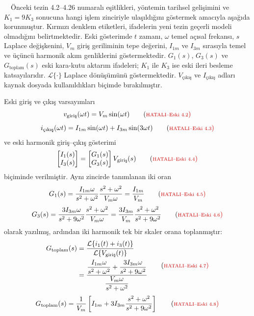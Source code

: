 \eskitezetiketi\ \hatalidenklemetiketi\ Önceki tezin 4.2--4.26 numaralı eşitlikleri, yöntemin tarihsel gelişimini ve $K_1=9K_3$ sonucuna hangi işlem zinciriyle ulaşıldığını göstermek amacıyla aşağıda korunmuştur. Kırmızı denklem etiketleri, ifadelerin yeni tezin geçerli modeli olmadığını belirtmektedir. Eski gösterimde $t$ zamanı, $\omega$ temel açısal frekansı, $s$ Laplace değişkenini, $V_m$ giriş geriliminin tepe değerini, $I_{1m}$ ve $I_{3m}$ sırasıyla temel ve üçüncü harmonik akım genliklerini göstermektedir. $G_1(s)$, $G_3(s)$ ve $G_{\mathrm{toplam}}(s)$ eski kara-kutu aktarım ifadeleri; $K_1$ ile $K_3$ ise eski ileri besleme katsayılarıdır. $\mathcal{L}\{\cdot\}$ Laplace dönüşümünü göstermektedir. $V_{\text{çıkış}}$ ve $I_{\text{çıkış}}$ adları kaynak dosyada kullanıldıkları biçimde bırakılmıştır.

Eski giriş ve çıkış varsayımları
\begin{equation*}
  v_{\text{giriş}}(\omega t)=V_m\sin(\omega t)
  \hatalieskitag{4.2}
\end{equation*}
\begin{equation*}
  i_{\text{çıkış}}(\omega t)
  =I_{1m}\sin(\omega t)+I_{3m}\sin(3\omega t)
  \hatalieskitag{4.3}
\end{equation*}
ve eski harmonik giriş--çıkış gösterimi
\begin{equation*}
  \begin{bmatrix}I_1(s)\\ I_3(s)\end{bmatrix}
  =
  \begin{bmatrix}G_1(s)\\ G_3(s)\end{bmatrix}V_{\text{giriş}}(s)
  \hatalieskitag{4.4}
\end{equation*}
biçiminde verilmiştir. Aynı zincirde tanımlanan iki oran
\begin{equation*}
  G_1(s)
  =\frac{I_{1m}\omega}{s^2+\omega^2}
   \frac{s^2+\omega^2}{V_m\omega}
  =\frac{I_{1m}}{V_m}
  \hatalieskitag{4.5}
\end{equation*}
\begin{equation*}
  G_3(s)
  =\frac{3I_{3m}\omega}{s^2+9\omega^2}
   \frac{s^2+\omega^2}{V_m\omega}
  =\frac{3I_{3m}}{V_m}\frac{s^2+\omega^2}{s^2+9\omega^2}
  \hatalieskitag{4.6}
\end{equation*}
olarak yazılmış, ardından iki harmonik tek bir skaler orana toplanmıştır:
\begin{equation*}
  \begin{aligned}
  G_{\mathrm{toplam}}(s)
  &=\frac{\mathcal{L}\{i_1(t)+i_3(t)\}}
          {\mathcal{L}\{V_{\text{giriş}}(t)\}}\\
  &=\frac{\displaystyle
       \frac{I_{1m}\omega}{s^2+\omega^2}
       +\frac{3I_{3m}\omega}{s^2+9\omega^2}}
      {\displaystyle\frac{V_m\omega}{s^2+\omega^2}}
  \end{aligned}
  \hatalieskitag{4.7}
\end{equation*}
\begin{equation*}
  G_{\mathrm{toplam}}(s)
  =\frac{1}{V_m}\left[
    I_{1m}+3I_{3m}\frac{s^2+\omega^2}{s^2+9\omega^2}
  \right]
  \hatalieskitag{4.8}
\end{equation*}

